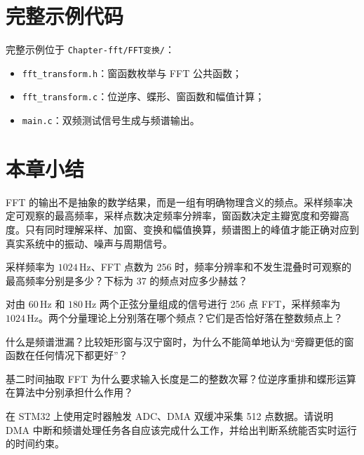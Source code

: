 \section{完整示例代码}

完整示例位于 \texttt{Chapter-fft/FFT变换/}：

\begin{itemize}
\item \texttt{fft\_transform.h}：窗函数枚举与 FFT 公共函数；
\item \texttt{fft\_transform.c}：位逆序、蝶形、窗函数和幅值计算；
\item \texttt{main.c}：双频测试信号生成与频谱输出。
\end{itemize}

\section{本章小结}

FFT 的输出不是抽象的数学结果，而是一组有明确物理含义的频点。采样频率决定可观察的最高频率，采样点数决定频率分辨率，窗函数决定主瓣宽度和旁瓣高度。只有同时理解采样、加窗、变换和幅值换算，频谱图上的峰值才能正确对应到真实系统中的振动、噪声与周期信号。

\begin{problemset}
\item 采样频率为 $1024\,\mathrm{Hz}$、FFT 点数为 256 时，频率分辨率和不发生混叠时可观察的最高频率分别是多少？下标为 37 的频点对应多少赫兹？
\item 对由 $60\,\mathrm{Hz}$ 和 $180\,\mathrm{Hz}$ 两个正弦分量组成的信号进行 256 点 FFT，采样频率为 $1024\,\mathrm{Hz}$。两个分量理论上分别落在哪个频点？它们是否恰好落在整数频点上？
\item 什么是频谱泄漏？比较矩形窗与汉宁窗时，为什么不能简单地认为“旁瓣更低的窗函数在任何情况下都更好”？
\item 基二时间抽取 FFT 为什么要求输入长度是二的整数次幂？位逆序重排和蝶形运算在算法中分别承担什么作用？
\item 在 STM32 上使用定时器触发 ADC、DMA 双缓冲采集 512 点数据。请说明 DMA 中断和频谱处理任务各自应该完成什么工作，并给出判断系统能否实时运行的时间约束。
\end{problemset}
